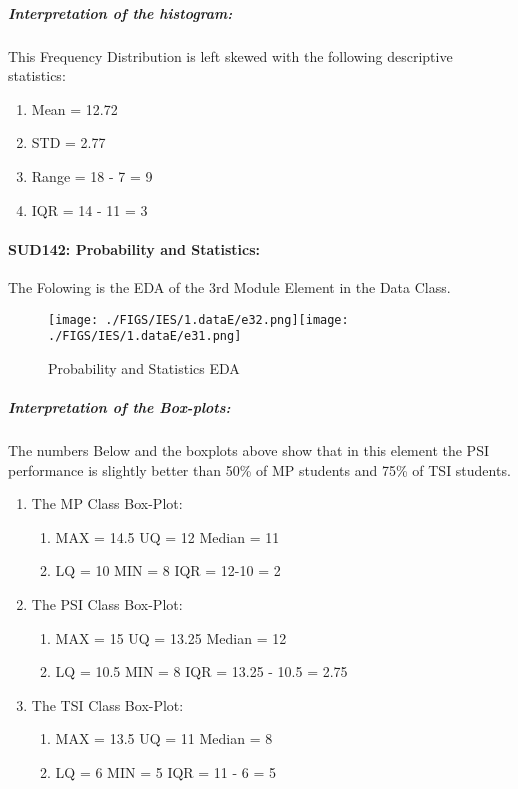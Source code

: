 \documentclass[12pt]{extreport}
\begin{document}
\subparagraph{Interpretation of the histogram:\\
}
This Frequency Distribution is left skewed with the following descriptive statistics:
\begin{enumerate}
	\item Mean = 12.72
	\item STD = 2.77
	\item Range = 18 - 7 = 9
	\item IQR = 14 - 11 = 3
\end{enumerate}




\paragraph{\large SUD142: Probability and Statistics:\\
} 

The Folowing is the EDA of the 3rd Module Element in the Data Class.


\begin{figure}[H]
	\centering
	\texttt{[image: ./FIGS/IES/1.dataE/e32.png]}\texttt{[image: ./FIGS/IES/1.dataE/e31.png]}
	\caption{Probability and Statistics EDA}
	\label{fig:8}
\end{figure}



\subparagraph{Interpretation of the Box-plots:\\
}
The numbers Below and the boxplots above show that in this element the PSI performance is slightly better than 50\% of MP students and 75\% of TSI students.

\begin{enumerate}
	\item The MP Class Box-Plot:
	\begin{enumerate}
		\item MAX = 14.5 {} {} {} {} {} {} {} {} UQ = 12 {} {} {} {} {} {} {} {} Median = 11			
		\item LQ = 10 {} {} {} {} {} {} {} {} MIN =	8 {} {} {} {} {} {} {} {} IQR = 12-10 = 2			
	\end{enumerate}
	\item The PSI Class Box-Plot:
	\begin{enumerate}
		\item MAX = 15 {} {} {} {} {} {} {} {} UQ = 13.25 {} {} {} {} {} {} {} {} Median = 12		
		\item LQ = 10.5 {} {} {} {} {} {} {} {}	MIN = 8 {} {} {} {} {} {} {} {}  IQR = 13.25 - 10.5 = 2.75	
	\end{enumerate}
	\item The TSI Class Box-Plot:
	\begin{enumerate}
		\item MAX = 13.5{} {} {} {} {} {} {} {} UQ = 11 {} {} {} {} {} {} {} {} Median = 8 				
		\item LQ = 6 {} {} {} {} {} {} {} {} MIN = 5 {} {} {} {} {} {} {} {}  IQR = 11 - 6 = 5		
	\end{enumerate}
\end{enumerate}
\end{document}
